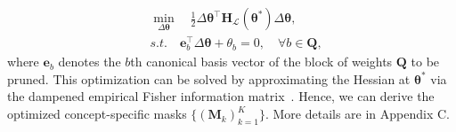 \documentclass[letterpaper]{article} %
\DeclareMathOperator*{\argmin}{arg\,min}
\begin{document}
\begin{equation}\label{eq:optimization}
    \begin{aligned}
        &\min_{\Delta \bm\theta} \quad \frac{1}{2} \Delta \bm{\theta}^\top \bm{H}_{\mathcal{L}} (\bm{\theta^\ast}) \Delta \bm\theta,
        \\& s.t. \quad \bm{e}_b^{\top} \Delta \bm\theta + \theta_b = 0, \quad \forall b \in \bm{Q},
    \end{aligned}
\end{equation}
where $\bm{e}_b$ denotes the $b$th canonical basis vector of the block of weights $\bm{Q}$ to be pruned. 
This optimization can be solved by approximating the
Hessian at $\bm\theta^\ast$ via the dampened empirical Fisher
information matrix~\citep{hassibi1992second,kurtic2022optimal}. Hence, we can derive the optimized concept-specific masks $\{(\bm{M}_k)_{k=1}^K\}$. More details are in Appendix C.


    



\end{document}
